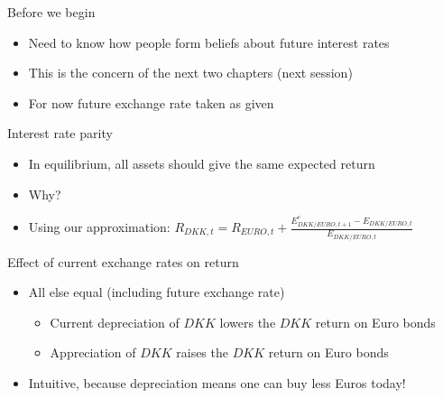 \documentclass{beamer}
\begin{document}
\begin{frame}{Before we begin}

    \begin{itemize}
        \item Need to know how people form beliefs about future interest rates
        \item This is the concern of the next two chapters (next session)
        \item For now future exchange rate taken as given
    \end{itemize}

\end{frame}

\begin{frame}{Interest rate parity}

    \begin{itemize}
        \item In equilibrium, all assets should give the same expected return
        \item Why?
        \item Using our approximation:
    $R_{DKK,t} = R_{EURO,t} + \frac{E^{e}_{DKK/EURO, t+1} - E_{DKK/EURO,t}}{E_{DKK/EURO,t}}$
    \end{itemize}

\end{frame}


\begin{frame}{Effect of current exchange rates on return}

    \begin{itemize}
        \item All else equal (including future exchange rate)
        \begin{itemize}
            \item Current depreciation of $DKK$ lowers the $DKK$ return on Euro bonds
            \item Appreciation of $DKK$ raises the $DKK$ return on Euro bonds
        \end{itemize}
        \item Intuitive, because depreciation means one can buy less Euros today!
    \end{itemize}

\end{frame}
\end{document}
